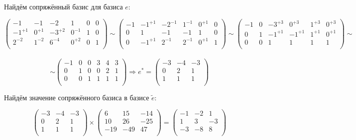 \documentclass{article}
\begin{document}
\begin{center}
Найдём сопряжённый базис для базиса $e$:
\end{center}
\noindent$$\left(\begin{array}{lll|lll}
-1 & -1 & -2 & 1 & 0 & 0 \\
-1^{+1} & 0^{+1} & -3^{+2} & 0^{-1} & 1 & 0 \\
2^{-2} & 1^{-2} & 6^{-4} & 0^{+2} & 0 & 1 \\
\end{array}\right) \sim
\left(\begin{array}{rll|lll}
-1 & -1^{+1} & -2^{-1} & 1^{-1} & 0^{+1} & 0 \\
0 & 1 & -1 & -1 & 1 & 0 \\
0 & -1^{+1} & 2^{-1} & 2^{-1} & 0^{+1} & 1 \\
\end{array}\right) \sim
\left(\begin{array}{rll|lll}
-1 & 0 & -3^{+3} & 0^{+3} & 1^{+3} & 0^{+3} \\
0 & 1 & -1^{+1} & -1^{+1} & 1^{+1} & 0^{+1} \\
0 & 0 & 1 & 1 & 1 & 1 \\
\end{array}\right) \sim$$ \\
$$ \sim \left(\begin{array}{rll|lll}
-1 & 0 & 0 & 3 & 4 & 3 \\
0 & 1 & 0 & 0 & 2 & 1 \\
0 & 0 & 1 & 1 & 1 & 1 \\
\end{array}\right) \Rightarrow
e^* = \left(\begin{array}{rrr}
-3 & -4 & -3 \\
0 & 2 & 1 \\
1 & 1 & 1 \\
\end{array}\right)$$

\begin{center}
Найдём значение сопряжённого базиса в базисе $\tilde{e}$:
\end{center}
$$\left(\begin{array}{rrr}
-3 & -4 & -3 \\
0 & 2 & 1 \\
1 & 1 & 1 \\
\end{array}\right) \times
\left(\begin{array}{rrr}
6 & 15 & -14 \\
10 & 26 & -25 \\
-19 & -49 & 47 \\
\end{array}\right) = 
\left(\begin{array}{rrr}
-1 & -2 & 1 \\
1 & 3 & -3 \\
-3 & -8 & 8 \\
\end{array}\right)$$
\end{document}
